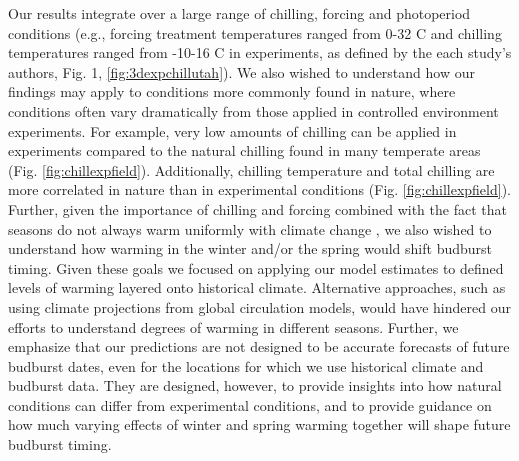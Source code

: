 \documentclass{article}
\begin{document}
Our results integrate over a large range of chilling, forcing and photoperiod conditions (e.g., forcing treatment temperatures ranged from 0-32 \degree C and chilling temperatures ranged from -10-16 \degree C in experiments, as defined by the each study's authors, Fig. 1, \ref{fig:3dexpchillutah}). We also wished to understand how our findings may apply to conditions more commonly found in nature, where conditions often vary dramatically from those applied in controlled environment experiments. For example, very low amounts of chilling can be applied in experiments compared to the natural chilling found in many temperate areas (Fig. \ref{fig:chillexpfield}). Additionally, chilling temperature and total chilling are more correlated in nature than in experimental conditions (Fig. \ref{fig:chillexpfield}). Further, given the importance of chilling and forcing combined with the fact that seasons do not always warm uniformly with climate change \citep{vautard2014,eea2019}, we also wished to understand how warming in the winter and/or the spring would shift budburst timing. Given these goals we focused on applying our model estimates to defined levels of warming layered onto historical climate. Alternative approaches, such as using climate projections from global circulation models, would have hindered our efforts to understand degrees of warming in different seasons. Further, we emphasize that our predictions are not designed to be accurate forecasts of future budburst dates, even for the locations for which we use historical climate and budburst data. They are designed, however, to provide insights into how natural conditions can differ from experimental conditions, and to provide guidance on how much varying effects of winter and spring warming together will shape future budburst timing.
\end{document}
